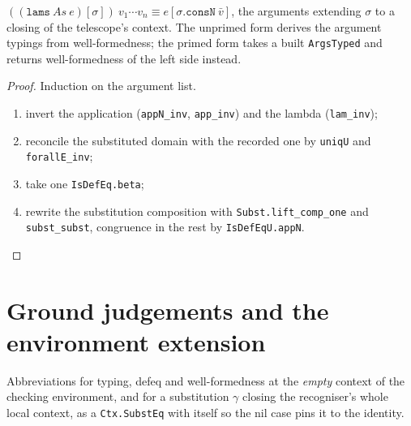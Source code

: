 \begin{theorem}
\label{vpc:thm:lams-appn}
\leanok
{}

 $((\mathtt{lams}\ \mathit{As}\ e)[\sigma])\ v_1\cdots v_n \equiv
e[\sigma.\mathtt{consN}\ \bar{v}]$, the arguments extending $\sigma$ to a closing of the
telescope's context.
The unprimed form derives the argument typings from well-formedness; the primed form takes a
built \texttt{ArgsTyped} and returns well-formedness of the left side instead.
\end{theorem}
\begin{proof}\leanok
{}
 Induction on the argument list. 
\begin{enumerate}
\item invert the application (\texttt{appN\_inv}, \texttt{app\_inv}) and the lambda
(\texttt{lam\_inv});
\item reconcile the substituted domain with the recorded one by \texttt{uniqU} and
\texttt{forallE\_inv};
\item take one \texttt{IsDefEq.beta};
\item rewrite the substitution composition with \texttt{Subst.lift\_comp\_one} and
\texttt{subst\_subst}, congruence in the rest by \texttt{IsDefEqU.appN}.
\end{enumerate}
\end{proof}

\section{Ground judgements and the environment extension}

\begin{definition}
\label{vpc:def:vcontext-ground}
\leanok
{}

 Abbreviations for typing, defeq and well-formedness at the \emph{empty} context of
the checking environment, and for a substitution $\gamma$ closing the recogniser's whole local
context, as a \texttt{Ctx.SubstEq} with itself so the nil case pins it to the identity.
\end{definition}

